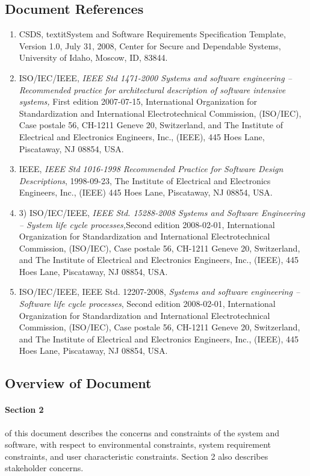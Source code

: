 \documentclass[12pt,a4paper,titlepage]{article}
\begin{document}
\subsection{Document References}
\begin{enumerate}
\item CSDS, textit{System and Software Requirements Specification Template}, Version 1.0, July
31, 2008, Center for Secure and Dependable Systems, University of Idaho, Moscow, ID, 83844.

\item ISO/IEC/IEEE, \textit{IEEE Std 1471-2000 Systems and software engineering -- Recommended practice for architectural description of software intensive systems,} First edition 2007-07-15, International Organization for Standardization and International Electrotechnical Commission, (ISO/IEC), Case postale 56, CH-1211 Geneve 20, Switzerland, and The Institute of Electrical and Electronics Engineers, Inc., (IEEE), 445 Hoes Lane, Piscataway, NJ 08854, USA.

\item IEEE, \textit{IEEE Std 1016-1998 Recommended Practice for Software Design Descriptions}, 1998-09-23, The Institute of Electrical and Electronics Engineers, Inc., (IEEE) 445 Hoes Lane, Piscataway, NJ 08854, USA.

\item 3) ISO/IEC/IEEE, \textit{IEEE Std. 15288-2008 Systems and Software Engineering -- System life cycle processes,}Second edition 2008-02-01, International Organization for Standardization and International Electrotechnical Commission, (ISO/IEC), Case postale 56, CH-1211 Geneve 20, Switzerland, and The Institute of Electrical and Electronics Engineers, Inc., (IEEE), 445 Hoes Lane, Piscataway, NJ 08854, USA.

\item ISO/IEC/IEEE, IEEE Std. 12207-2008, \textit{Systems and software engineering -- Software life cycle processes}, Second edition 2008-02-01, International Organization for Standardization and International Electrotechnical Commission, (ISO/IEC), Case postale 56, CH-1211 Geneve 20, Switzerland, and The Institute of Electrical and Electronics Engineers, Inc., (IEEE), 445 Hoes Lane, Piscataway, NJ 08854, USA.
\end{enumerate}

\subsection{Overview of Document}
\paragraph{Section 2} of this document describes the concerns and constraints of the system and software, with respect to environmental constraints, system requirement constraints, and user characteristic constraints. Section 2 also describes stakeholder concerns.
\end{document}
